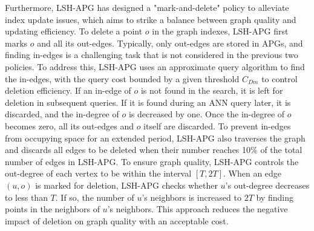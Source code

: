 Furthermore, LSH-APG has designed a "mark-and-delete" policy to alleviate index update issues, which aims to strike a balance between graph quality and updating efficiency. To delete a point $o$ in the graph indexes, LSH-APG first marks $o$ and all its out-edges. Typically, only out-edges are stored in APGs, and finding in-edges is a challenging task that is not considered in the previous two policies. To address this, LSH-APG uses an approximate query algorithm to find the in-edges, with the query cost bounded by a given threshold $C_{Dm}$ to control deletion efficiency. If an in-edge of $o$ is not found in the search, it is left for deletion in subsequent queries. If it is found during an ANN query later, it is discarded, and the in-degree of $o$ is decreased by one. Once the in-degree of $o$ becomes zero, all its out-edges and $o$ itself are discarded. To prevent in-edges from occupying space for an extended period, LSH-APG also traverses the graph and discards all edges to be deleted when their number reaches 10$\%$ of the total number of edges in LSH-APG. To ensure graph quality, LSH-APG controls the out-degree of each vertex to be within the interval $[T,2T]$. When an edge $(u,o)$ is marked for deletion, LSH-APG checks whether $u$'s out-degree decreases to less than $T$. If so, the number of $u$'s neighbors is increased to $2T$ by finding points in the neighbors of $u$'s neighbors. This approach reduces the negative impact of deletion on graph quality with an acceptable cost.

